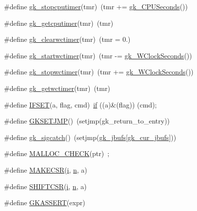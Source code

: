 \begin{DoxyCompactItemize}
\item 
\#define \hyperlink{a00053_acc9b1a073612fb69a4b4adef68c51439}{gk\+\_\+stopcputimer}(tmr)~(tmr += \hyperlink{a00158_a3e9b43a695411f5f0b3396083fe688d6}{gk\+\_\+\+C\+P\+U\+Seconds}())
\item 
\#define \hyperlink{a00053_a370b22ba2cf70cf3f550722e182262d0}{gk\+\_\+getcputimer}(tmr)~(tmr)
\item 
\#define \hyperlink{a00053_a9d358a26c5d49a19c6e188f4a2da3372}{gk\+\_\+clearwctimer}(tmr)~(tmr = 0.)
\item 
\#define \hyperlink{a00053_a62391ec1e07912f942d70c2015756c62}{gk\+\_\+startwctimer}(tmr)~(tmr -\/= \hyperlink{a00158_abc56539a50e81723bb4f80b5529708d0}{gk\+\_\+\+W\+Clock\+Seconds}())
\item 
\#define \hyperlink{a00053_a58435b46c1a70f7bf3f40e8c6adfdf46}{gk\+\_\+stopwctimer}(tmr)~(tmr += \hyperlink{a00158_abc56539a50e81723bb4f80b5529708d0}{gk\+\_\+\+W\+Clock\+Seconds}())
\item 
\#define \hyperlink{a00053_a856bc6009a6980a37711be6d8d80663f}{gk\+\_\+getwctimer}(tmr)~(tmr)
\item 
\#define \hyperlink{a00053_ad41a4aa918730bbed6aa9471adb8fdb2}{I\+F\+S\+ET}(a,  flag,  cmd)~\hyperlink{a00614_a96c738d3e2120c4273f9d4390761d99e}{if} ((a)\&(flag)) (cmd);
\item 
\#define \hyperlink{a00053_a2d2c0f535e4a92f5dfe0420c159045ab}{G\+K\+S\+E\+T\+J\+MP}()~(setjmp(gk\+\_\+return\+\_\+to\+\_\+entry))
\item 
\#define \hyperlink{a00053_a59a6c75b539b1e491180612cc74063c1}{gk\+\_\+sigcatch}()~(setjmp(\hyperlink{a00047_ab371a33f6ef660f6c8192c47a5acb5f0}{gk\+\_\+jbufs}\mbox{[}\hyperlink{a00047_a4977ceba83d44d803185a470184ce54c}{gk\+\_\+cur\+\_\+jbufs}\mbox{]}))
\item 
\#define \hyperlink{a00053_a095506946a5862a37905e2014ea97f4e}{M\+A\+L\+L\+O\+C\+\_\+\+C\+H\+E\+CK}(ptr)~;
\item 
\#define \hyperlink{a00053_a475f3191b01ce1b1cbce5d4fba41f3e7}{M\+A\+K\+E\+C\+SR}(\hyperlink{a00608_afb6aca53df96564f2adf086c942453ec}{i},  \hyperlink{a00623_a781a04ab095280f838ff3eb0e51312e0}{n},  a)
\item 
\#define \hyperlink{a00053_a65e175a83f3bbb4a4b15a01d2a055e61}{S\+H\+I\+F\+T\+C\+SR}(\hyperlink{a00608_afb6aca53df96564f2adf086c942453ec}{i},  \hyperlink{a00623_a781a04ab095280f838ff3eb0e51312e0}{n},  a)
\item 
\#define \hyperlink{a00053_ab1ae193a061163eee387ad2f36fe98dd}{G\+K\+A\+S\+S\+E\+RT}(expr)
\item 

\end{DoxyCompactItemize}
